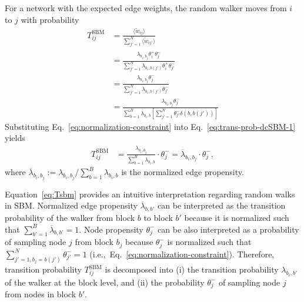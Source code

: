 \documentclass[12pt]{article} %
\DeclareMathOperator{\diag}{diag}
\def\ie{i.e.,~}
\def\diag{\text{diag}}
\def\mat#1{\mathbf{#1}}
\begin{document}
For a network with the expected edge weights, the random walker moves from $i$ to $j$ with probability
\begin{align}
    \label{eq:trans-prob-dcSBM-1}
    T^{\text{SBM}} _{ij} & = \frac{\langle\tilde w_{ij}\rangle}{\sum_{j'=1}^N \langle\tilde w_{ij'}\rangle} \nonumber \\
                         & = \frac{\lambda_{b_i,b_j} \theta^{+}_i \theta^{-}_j}{\sum_{j'=1}^N \lambda_{b_i,b(j')} \theta^{+}_i \theta^{-}_{j'}} \nonumber \\
                         & = \frac{\lambda_{b_i,b_j} \theta^{-}_j}{\sum_{j'=1}^N \lambda_{b_i,b(j')} \theta^{-}_{j'}} \nonumber \\
                         & = \frac{\lambda_{b_i,b_j} \theta^{-}_j}{\sum_{b=1}^B \lambda_{b_i,b} \left[\sum_{j'=1}^N\theta^{-}_{j'}\delta(b, b(j'))\right]}
\end{align}
Substituting Eq.~\eqref{eq:normalization-constraint} into Eq.~\eqref{eq:trans-prob-dcSBM-1} yields
\begin{align}
    \label{eq:Tsbm}
    T^{\text{SBM}} _{ij} &= \frac{\lambda_{b_i,b_j}}{\sum_{b=1}^B \lambda_{b_i,b}} \cdot  \theta^{-}_j = \overline \lambda_{b_i, b_j} \cdot  \theta^{-}_j,
\end{align}
where $\overline \lambda_{b_i, b_j}:= \lambda_{b_i,b_j} / \sum_{b=1}^B \lambda_{b_i,b}$ is the normalized edge propensity.

Equation~\eqref{eq:Tsbm} provides an intuitive interpretation regarding random walks in SBM.
Normalized edge propensity $\overline \lambda_{b, b'}$ can be interpreted as the transition probability of the walker from block $b$ to block $b'$ because it is normalized such that $\sum_{b'=1}^B \overline \lambda_{b, b'}=1$.
Node propensity $\theta^{-} _j$ can be also interpreted as a probability of sampling node $j$ from block $b_j$ because $\theta^{-} _j$ is normalized such that $\sum_{j'=1, b_j=b(j')}^N \theta^{-} _{j'}= 1$ (\ie Eq.~\eqref{eq:normalization-constraint}).
Therefore, transition probability $T^{\text{SBM}} _{ij}$ is decomposed into (i) the transition probability $\lambda_{b_i, b'}$ of the walker at the block level, and (ii) the probability $\theta^- _j$ of sampling node $j$ from nodes in block $b'$.
\end{document}
